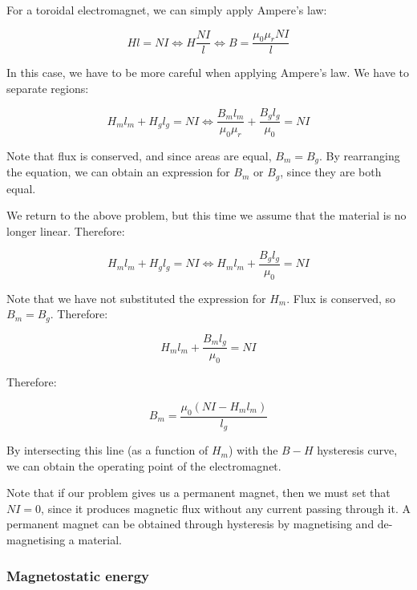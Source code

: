 \documentclass{article}
\begin{document}
\begin{example}
    For a toroidal electromagnet, we can simply apply Ampere's law:

    \[ Hl = NI \iff H \frac{NI}{l} \iff B = \frac{\mu_0\mu_r NI}{l} \]
\end{example}

\begin{example}
    In this case, we have to be more careful when applying Ampere's law. We have to separate regions:

    \[ H_ml_m + H_gl_g = NI \iff \frac{B_m l_m}{\mu_0\mu_r} + \frac{B_g l_g}{\mu_0} = NI \]

    Note that flux is conserved, and since areas are equal, $B_m = B_g$. By rearranging the equation, we can obtain an expression for $B_m$ or $B_g$, since they are both equal.
\end{example}

\begin{example}
    We return to the above problem, but this time we assume that the material is no longer linear. Therefore:

    \[ H_m l_m + H_g l_g = NI \iff H_m l_m + \frac{B_g l_g}{\mu_0} = NI \]

    Note that we have not substituted the expression for $H_m$. Flux is conserved, so $B_m = B_g$. Therefore:

    \[ H_m l_m + \frac{B_m l_g}{\mu_0} = NI \]

    Therefore:

    \[ B_m = \frac{\mu_0(NI - H_m l_m)}{l_g} \]

    By intersecting this line (as a function of $H_m$) with the $B-H$ hysteresis curve, we can obtain the operating point of the electromagnet.
\end{example}

Note that if our problem gives us a permanent magnet, then we must set that $NI = 0$, since it produces magnetic flux without any current passing through it. A permanent magnet can be obtained through hysteresis by magnetising and de-magnetising a material.

\subsubsection{Magnetostatic energy}
\end{document}
